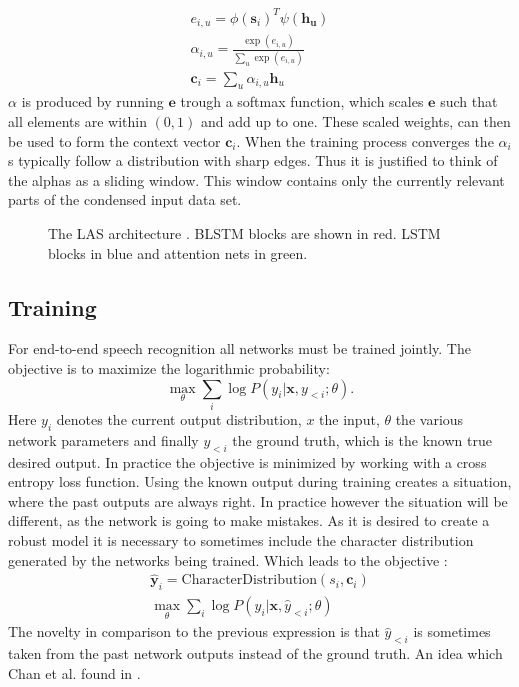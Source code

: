 \begin{align}
e_{i,u} = \phi(\mathbf{s}_i)^T \psi(\mathbf{h_u}) \\
\alpha_{i,u} = \frac{ \exp(e_{i,u})}{ \sum\limits_{u} \exp(e_{i,u})} \\
\mathbf{c}_i = \sum\limits_{u} \alpha_{i,u} \mathbf{h}_u
\end{align}
$\alpha$ is produced by running $\mathbf{e}$ trough a softmax function, which scales $\mathbf{e}$ such that all elements are within $(0,1)$ and add up to one. These scaled weights, can then be used to form the context vector $\mathbf{c}_i$. When the training process converges the $\alpha_i$s typically follow a distribution with sharp edges\cite[page 5]{Chan2015}. Thus it is justified to think of the alphas as a sliding window. This window contains only the currently relevant parts of the condensed input data set.

\begin{figure}

\caption{The LAS architecture \cite[page 3]{Chan2015}. BLSTM blocks are shown in red. LSTM blocks in blue and attention nets in green.}
\label{fig:las}
\end{figure}

\subsection{Training}
For end-to-end speech recognition all networks must be trained jointly. The objective is to maximize the logarithmic probability:
\begin{equation}
\max\limits_\theta \sum\limits_{i} \log P(y_i | \mathbf{x}, y_{<i};\theta).
\end{equation}
Here $y_i$ denotes the current output distribution, $x$ the input, $\theta$ the various network parameters and finally $y_{<i}$ the ground truth, which is the known true desired output. In practice the objective is minimized by working with a cross entropy loss function.
Using the known output during training creates a situation, where the past outputs are always right. In practice however the situation will be different, as the network is going to make mistakes. As it is desired to create a robust model it is necessary to sometimes include the character distribution generated by the networks being trained.
Which leads to the objective \cite[page 5]{Chan2015}:
\begin{align}
\hat{\mathbf{y}}_{i} = \text{CharacterDistribution}(s_i,\textbf{c}_i) \\
\max_{\theta} \sum\limits_{i} \log P(y_i|\mathbf{x}, \hat{y}_{<i};\theta)
\end{align}
The novelty in comparison to the previous expression is that $\hat{y}_{<i}$ is sometimes taken from the past network outputs instead of the ground truth. An idea which Chan et al. found in \cite{Bengio2015}.

